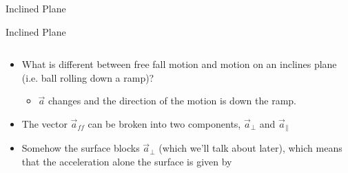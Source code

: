 \documentclass{beamer}
\begin{document}
\begin{frame}{Inclined Plane}
\begin{center}
   \color{blue}{\Huge Motion on an Inclined Plane}
\end{center}
\end{frame}

\begin{frame}{Inclined Plane}
\begin{columns}
\begin{column}{0.5\textwidth}
\begin{itemize}
   \item What is different between free fall motion and motion on an inclines plane (i.e. ball rolling down a ramp)?
   \begin{itemize}
      \item<2-> $\vec{a}$ changes and the direction of the motion is down the ramp.
   \end{itemize}
   \item<2-> The vector $\vec{a}_{ff}$ can be broken into two components, $\vec{a}_\bot$ and $\vec{a}_\parallel$
   \item<3-> Somehow the surface blocks $\vec{a}_\bot$ (which we'll talk about later), which means that the acceleration alone the surface is given by
\end{itemize}

\end{column}
\end{columns}
\end{frame}
\end{document}
